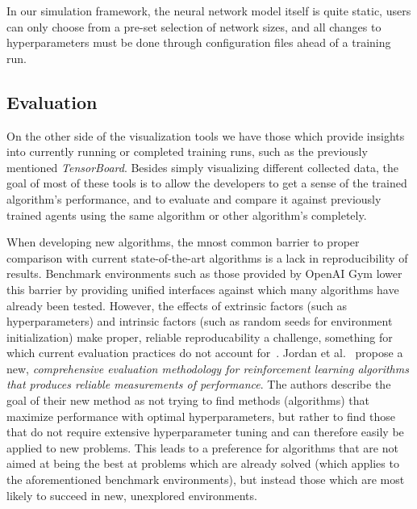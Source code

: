 In our simulation framework, the neural network model itself is quite static, users can only choose from a pre-set selection of network sizes, and all changes to hyperparameters must be done through configuration files ahead of a training run.

\subsection*{Evaluation}

On the other side of the visualization tools we have those which provide insights into currently running or completed training runs, such as the previously mentioned \emph{TensorBoard}. Besides simply visualizing different collected data, the goal of most of these tools is to allow the developers to get a sense of the trained algorithm's performance, and to evaluate and compare it against previously trained agents using the same algorithm or other algorithm's completely.

When developing new algorithms, the mnost common barrier to proper comparison with current state-of-the-art algorithms is a lack in reproducibility of results. Benchmark environments such as those provided by OpenAI Gym \cite{OpenAIGym} lower this barrier by providing unified interfaces against which many algorithms have already been tested. However, the effects of extrinsic factors (such as hyperparameters) and intrinsic factors (such as random seeds for environment initialization) make proper, reliable reproducability a challenge, something for which current evaluation practices do not account for~\cite{DRLThatMatters}. Jordan et al.~\cite{EvaluatingPerformance} propose a new, \emph{comprehensive evaluation methodology for reinforcement learning algorithms that produces reliable measurements of performance}. The authors describe the goal of their new method as not trying to find methods (algorithms) that maximize performance with optimal hyperparameters, but rather to find those that do not require extensive hyperparameter tuning and can therefore easily be applied to new problems. This leads to a preference for algorithms that are not aimed at being the best at problems which are already solved (which applies to the aforementioned benchmark environments), but instead those which are most likely to succeed in new, unexplored environments.